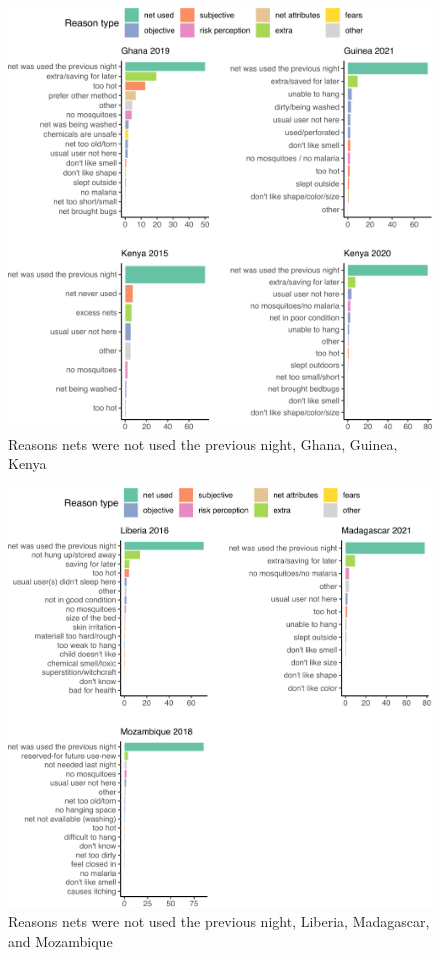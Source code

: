 \documentclass[review,
3p]{elsarticle} %
\begin{document}
\begin{figure}

{\centering \includegraphics[width=1\linewidth]{reasons_paper_files/figure-latex/gk_reas-1} 

}

\caption{\label{gk_reas}Reasons nets were not used the previous night, Ghana, Guinea, Kenya}\label{fig:gk_reas}
\end{figure}

\begin{figure}

{\centering \includegraphics[width=1\linewidth]{reasons_paper_files/figure-latex/lm_reas-1} 

}

\caption{\label{lm_reas}Reasons nets were not used the previous night, Liberia, Madagascar, and Mozambique}\label{fig:lm_reas}
\end{figure}
\end{document}
